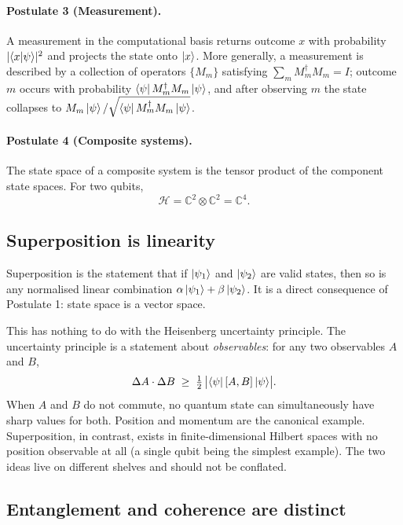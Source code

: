 \paragraph{Postulate 3 (Measurement).} A measurement in the computational basis returns outcome $x$ with probability $|\langle x|\psi\rangle|^2$ and projects the state onto $\mathinner{|{x}\rangle}$. More generally, a measurement is described by a collection of operators $\{M_m\}$ satisfying $\sum_m M_m^\dagger M_m = I$; outcome $m$ occurs with probability $\mathinner{\langle{\psi}|} M_m^\dagger M_m \mathinner{|{\psi}\rangle}$, and after observing $m$ the state collapses to $M_m \mathinner{|{\psi}\rangle}/\sqrt{\mathinner{\langle{\psi}|} M_m^\dagger M_m \mathinner{|{\psi}\rangle}}$.

\paragraph{Postulate 4 (Composite systems).} The state space of a composite system is the tensor product of the component state spaces. For two qubits,
\begin{equation}
\mathcal{H} = \mathbb{C}^2 \otimes \mathbb{C}^2 = \mathbb{C}^4.
\end{equation}

\subsection{Superposition is linearity}

Superposition is the statement that if $\mathinner{|{\psi_1}\rangle}$ and $\mathinner{|{\psi_2}\rangle}$ are valid states, then so is any normalised linear combination $\alpha\mathinner{|{\psi_1}\rangle} + \beta\mathinner{|{\psi_2}\rangle}$. It is a direct consequence of Postulate 1: state space is a vector space.

This has nothing to do with the Heisenberg uncertainty principle. The uncertainty principle is a statement about \emph{observables}: for any two observables $A$ and $B$,
\begin{equation}
\Delta A \cdot \Delta B \;\geq\; \tfrac{1}{2}\,\bigl|\mathinner{\langle{\psi}|}[A,B]\mathinner{|{\psi}\rangle}\bigr|.
\end{equation}
When $A$ and $B$ do not commute, no quantum state can simultaneously have sharp values for both. Position and momentum are the canonical example. Superposition, in contrast, exists in finite-dimensional Hilbert spaces with no position observable at all (a single qubit being the simplest example). The two ideas live on different shelves and should not be conflated.

\subsection{Entanglement and coherence are distinct}

